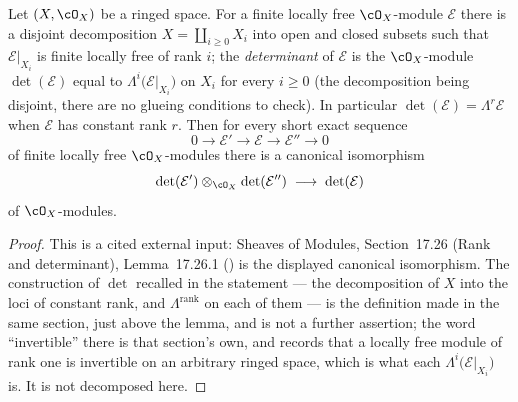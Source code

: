 \begin{lemma}
\label{lem:pc-det-short-exact-sequence}
Let $(X,\cO_X)$ be a ringed space.  For a finite locally free
$\cO_X$-module $\mathcal E$ there is a disjoint decomposition
$X=\coprod_{i\ge0}X_i$ into open and closed subsets such that
$\mathcal E|_{X_i}$ is finite locally free of rank $i$; the
\emph{determinant} of $\mathcal E$ is the
 $\cO_X$-module
$\det(\mathcal E)$ equal to $\Lambda^{i}\bigl(\mathcal E|_{X_i}\bigr)$
on $X_i$ for every $i\ge0$ (the decomposition being disjoint, there are
no glueing conditions to check).  In particular
$\det(\mathcal E)=\Lambda^{r}\mathcal E$ when $\mathcal E$ has constant
rank $r$.  Then for every short exact sequence
\[
0\to\mathcal E'\to\mathcal E\to\mathcal E''\to0
\]
of finite locally free $\cO_X$-modules there is a canonical
isomorphism
\[
\det(\mathcal E')\otimes_{\cO_X}\det(\mathcal E'')
\;\longrightarrow\;\det(\mathcal E)
\]
of $\cO_X$-modules.
\end{lemma}
\begin{proof}
This is a cited external input: Sheaves of Modules, Section~17.26
(Rank and determinant), Lemma~17.26.1 () is the
displayed canonical isomorphism.  The construction of $\det$ recalled
in the statement --- the decomposition of $X$ into the loci of constant
rank, and $\Lambda^{\text{rank}}$ on each of them --- is the definition
made in the same section, just above the lemma, and is not a further
assertion; the word ``invertible'' there is that section's own, and
 records that a
locally free module of rank one is invertible on an arbitrary ringed
space, which is what each $\Lambda^{i}\bigl(\mathcal E|_{X_i}\bigr)$
is.  It is not decomposed here.
\end{proof}

